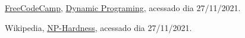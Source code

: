 \begin{thebibliography}{10}

      \href{https://www.freecodecamp.org}{FreeCodeCamp},
      \href{https://youtu.be/oBt53YbR9Kk?t=210}{Dynamic Programing},
      acessado dia 27/11/2021.
    
      Wikipedia,
      \href{https://en.wikipedia.org/wiki/NP-hardness}{NP-Hardness},
      acessado dia 27/11/2021.

    \end{thebibliography}